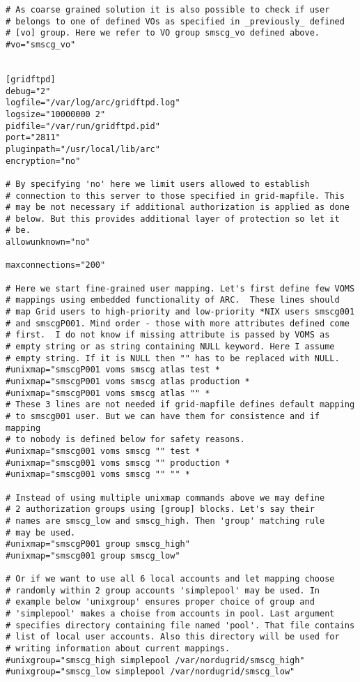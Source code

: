 \documentclass{article}
\begin{document}
\begin{verbatim}
# As coarse grained solution it is also possible to check if user 
# belongs to one of defined VOs as specified in _previously_ defined
# [vo] group. Here we refer to VO group smscg_vo defined above.
#vo="smscg_vo"


[gridftpd]
debug="2"
logfile="/var/log/arc/gridftpd.log"
logsize="10000000 2"
pidfile="/var/run/gridftpd.pid"
port="2811"
pluginpath="/usr/local/lib/arc"
encryption="no"

# By specifying 'no' here we limit users allowed to establish
# connection to this server to those specified in grid-mapfile. This
# may be not necessary if additional authorization is applied as done
# below. But this provides additional layer of protection so let it
# be.
allowunknown="no"

maxconnections="200"

# Here we start fine-grained user mapping. Let's first define few VOMS
# mappings using embedded functionality of ARC.  These lines should
# map Grid users to high-priority and low-priority *NIX users smscg001
# and smscgP001. Mind order - those with more attributes defined come
# first.  I do not know if missing attribute is passed by VOMS as
# empty string or as string containing NULL keyword. Here I assume
# empty string. If it is NULL then "" has to be replaced with NULL.
#unixmap="smscgP001 voms smscg atlas test *
#unixmap="smscgP001 voms smscg atlas production *
#unixmap="smscgP001 voms smscg atlas "" *
# These 3 lines are not needed if grid-mapfile defines default mapping
# to smscg001 user. But we can have them for consistence and if mapping
# to nobody is defined below for safety reasons.
#unixmap="smscg001 voms smscg "" test *
#unixmap="smscg001 voms smscg "" production *
#unixmap="smscg001 voms smscg "" "" *

# Instead of using multiple unixmap commands above we may define 
# 2 authorization groups using [group] blocks. Let's say their
# names are smscg_low and smscg_high. Then 'group' matching rule
# may be used. 
#unixmap="smscgP001 group smscg_high"
#unixmap="smscg001 group smscg_low"

# Or if we want to use all 6 local accounts and let mapping choose
# randomly within 2 group accounts 'simplepool' may be used. In
# example below 'unixgroup' ensures proper choice of group and
# 'simplepool' makes a choise from accounts in pool. Last argument
# specifies directory containing file named 'pool'. That file contains
# list of local user accounts. Also this directory will be used for
# writing information about current mappings.
#unixgroup="smscg_high simplepool /var/nordugrid/smscg_high"
#unixgroup="smscg_low simplepool /var/nordugrid/smscg_low"


\end{verbatim}
\end{document}
